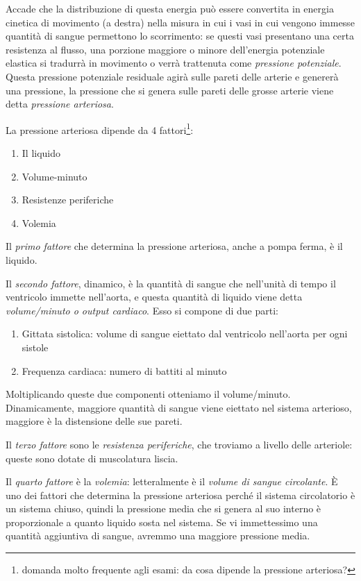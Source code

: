 \documentclass[a4paper,12pt]{article}
\begin{document}
Accade che la distribuzione di questa energia può essere convertita in energia cinetica di movimento (a destra) nella misura in cui i vasi in cui vengono immesse quantità di sangue permettono lo scorrimento: se questi vasi presentano una certa resistenza al flusso, una porzione maggiore o minore dell'energia potenziale elastica si tradurrà in movimento o verrà trattenuta come \emph{pressione potenziale}. Questa pressione potenziale residuale agirà sulle pareti delle arterie e genererà una pressione, la pressione che si genera sulle pareti delle grosse arterie viene detta \emph{pressione arteriosa}.

La pressione arteriosa dipende da 4 fattori\footnote{domanda molto frequente agli esami: da cosa dipende la pressione arteriosa?}:
\begin{enumerate}
\item{Il liquido}
\item{Volume-minuto}
\item{Resistenze periferiche}
\item{Volemia}
\end{enumerate}

Il \emph{primo fattore} che determina la pressione arteriosa, anche a pompa ferma, è il liquido. 

Il \emph{secondo fattore}, dinamico, è la quantità di sangue che nell'unità di tempo il ventricolo immette nell'aorta, e questa quantità di liquido viene detta \emph{volume/minuto o output cardiaco}. Esso si compone di due parti:
\begin{enumerate}
\item{Gittata sistolica: volume di sangue eiettato dal ventricolo nell'aorta per ogni sistole}
\item{Frequenza cardiaca: numero di battiti al minuto}
\end{enumerate}

Moltiplicando queste due componenti otteniamo il volume/minuto. Dinamicamente, maggiore quantità di sangue viene eiettato nel sistema arterioso, maggiore è la distensione delle sue pareti.

Il \emph{terzo fattore} sono le \emph{resistenza periferiche}, che troviamo a livello delle arteriole: queste sono dotate di muscolatura liscia.

Il \emph{quarto fattore} è la \emph{volemia}: letteralmente è il \emph{volume di sangue circolante}. È uno dei fattori che determina la pressione arteriosa perché il sistema circolatorio è un sistema chiuso, quindi la pressione media che si genera al suo interno è proporzionale a quanto liquido sosta nel sistema. Se vi immettessimo una quantità aggiuntiva di sangue, avremmo una maggiore pressione media.
\end{document}
